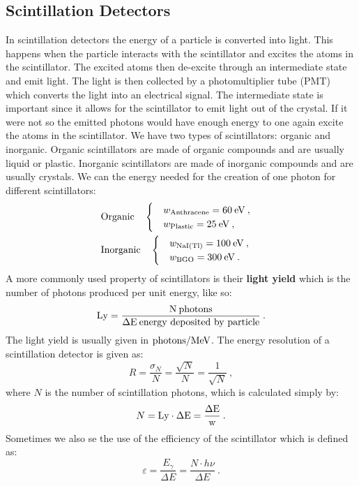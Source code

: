 \documentclass[10pt, titlepage, a4paper]{article}
\numberwithin{equation}{section}
\begin{document}
\subsection{Scintillation Detectors}
In scintillation detectors the energy of a particle is converted into light. This happens when the particle interacts with the scintillator and
excites the atoms in the scintillator. The excited atoms then de-excite through an intermediate state and emit light. The light is then collected by a photomultiplier tube (PMT)
which converts the light into an electrical signal. The intermediate state is important since it allows for the scintillator to emit light out of the crystal. If it were not so the 
emitted photons would have enough energy to one again excite the atoms in the scintillator. We have two types of scintillators: organic and inorganic. Organic scintillators are
made of organic compounds and are usually liquid or plastic. Inorganic scintillators are made of inorganic compounds and are usually crystals. We can the energy needed for the creation of 
one photon for different scintillators:
%
\begin{align*}
    &\text{Organic}\quad \begin{cases}
        & w_{\text{Anthracene}} = 60\>\rm{eV}\>, \\
        & w_{\text{Plastic}} = 25\>\rm{eV}\>, \\
    \end{cases}
    \quad \\
    &\text{Inorganic}\quad \begin{cases}
        & w_{\text{NaI(Tl)}} = 100\>\rm{eV}\>, \\
        & w_{\text{BGO}} = 300\>\rm{eV}\>. \\
    \end{cases}
\end{align*}
%
A more commonly used property of scintillators is their \textbf{light yield} which is the number of photons produced per unit energy, like so:
%
\begin{equation}
    \rm{Ly} = \frac{N\>\text{photons}}{\Delta E\>\text{energy deposited by particle}}\>.
    \label{eq:light-yield}
\end{equation}
%
The light yield is usually given in $\rm{photons/MeV}$. The energy resolution of a scintillation detector is given as:
%
\begin{equation}
    R = \frac{\sigma_N}{N} = \frac{\sqrt{N}}{N} = \frac{1}{\sqrt{N}}\>,
    \label{eq:scint-res}
\end{equation}
%
where $N$ is the number of scintillation photons, which is calculated simply by:
%
\begin{equation}
    N = \rm{Ly}\cdot\Delta E = \frac{\Delta E}{w}\>.
    \label{scint-N}
\end{equation}
%
Sometimes we also se the use of the efficiency of the scintillator which is defined as:
%
\begin{equation}
    \varepsilon = \frac{E_\gamma}{\Delta E} = \frac{N\cdot h\nu}{\Delta E}\>.
    \label{eq:scint-eff}
\end{equation}
%
\end{document}

